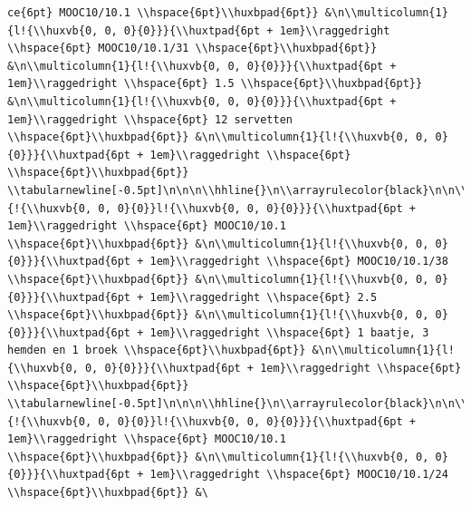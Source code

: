 \documentclass[11pt,preprint, authoryear]{elsarticle}
\numberwithin{equation}{section}
\numberwithin{figure}{section}
\numberwithin{table}{section}
\begin{document}
\begin{verbatim}
ce{6pt} MOOC10/10.1 \\hspace{6pt}\\huxbpad{6pt}} &\n\\multicolumn{1}{l!{\\huxvb{0, 0, 0}{0}}}{\\huxtpad{6pt + 1em}\\raggedright \\hspace{6pt} MOOC10/10.1/31 \\hspace{6pt}\\huxbpad{6pt}} &\n\\multicolumn{1}{l!{\\huxvb{0, 0, 0}{0}}}{\\huxtpad{6pt + 1em}\\raggedright \\hspace{6pt} 1.5 \\hspace{6pt}\\huxbpad{6pt}} &\n\\multicolumn{1}{l!{\\huxvb{0, 0, 0}{0}}}{\\huxtpad{6pt + 1em}\\raggedright \\hspace{6pt} 12 servetten \\hspace{6pt}\\huxbpad{6pt}} &\n\\multicolumn{1}{l!{\\huxvb{0, 0, 0}{0}}}{\\huxtpad{6pt + 1em}\\raggedright \\hspace{6pt}  \\hspace{6pt}\\huxbpad{6pt}} \\tabularnewline[-0.5pt]\n\n\n\\hhline{}\n\\arrayrulecolor{black}\n\n\\multicolumn{1}{!{\\huxvb{0, 0, 0}{0}}l!{\\huxvb{0, 0, 0}{0}}}{\\huxtpad{6pt + 1em}\\raggedright \\hspace{6pt} MOOC10/10.1 \\hspace{6pt}\\huxbpad{6pt}} &\n\\multicolumn{1}{l!{\\huxvb{0, 0, 0}{0}}}{\\huxtpad{6pt + 1em}\\raggedright \\hspace{6pt} MOOC10/10.1/38 \\hspace{6pt}\\huxbpad{6pt}} &\n\\multicolumn{1}{l!{\\huxvb{0, 0, 0}{0}}}{\\huxtpad{6pt + 1em}\\raggedright \\hspace{6pt} 2.5 \\hspace{6pt}\\huxbpad{6pt}} &\n\\multicolumn{1}{l!{\\huxvb{0, 0, 0}{0}}}{\\huxtpad{6pt + 1em}\\raggedright \\hspace{6pt} 1 baatje, 3 hemden en 1 broek \\hspace{6pt}\\huxbpad{6pt}} &\n\\multicolumn{1}{l!{\\huxvb{0, 0, 0}{0}}}{\\huxtpad{6pt + 1em}\\raggedright \\hspace{6pt}  \\hspace{6pt}\\huxbpad{6pt}} \\tabularnewline[-0.5pt]\n\n\n\\hhline{}\n\\arrayrulecolor{black}\n\n\\multicolumn{1}{!{\\huxvb{0, 0, 0}{0}}l!{\\huxvb{0, 0, 0}{0}}}{\\huxtpad{6pt + 1em}\\raggedright \\hspace{6pt} MOOC10/10.1 \\hspace{6pt}\\huxbpad{6pt}} &\n\\multicolumn{1}{l!{\\huxvb{0, 0, 0}{0}}}{\\huxtpad{6pt + 1em}\\raggedright \\hspace{6pt} MOOC10/10.1/24 \\hspace{6pt}\\huxbpad{6pt}} &\
\end{verbatim}
\end{document}
